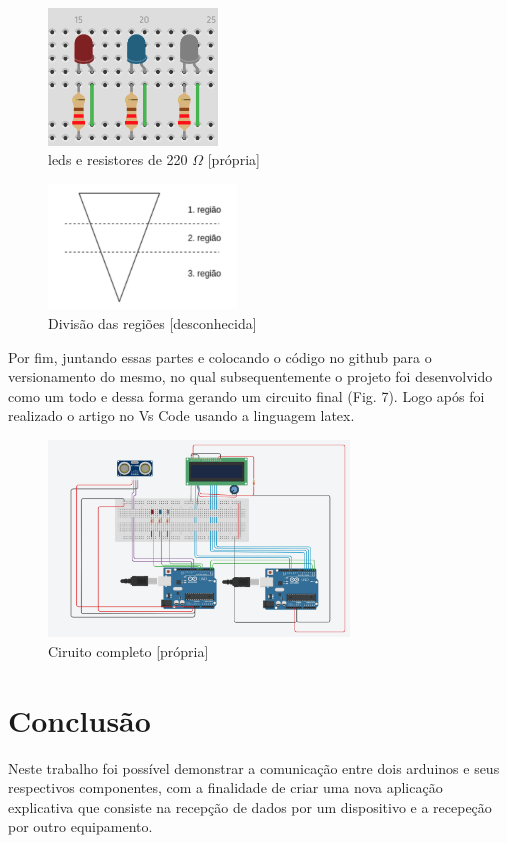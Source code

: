 \documentclass[conference]{IEEEtran}
\begin{document}
 \begin{figure}[htbp]
    \centerline{
        \includegraphics[width=4.5cm]{images/fig5.PNG}
        }
    \caption{leds e resistores de 220 $\Omega$ [própria]}
    \label{figura:fig5}
    \end{figure}

    \begin{figure}[htbp]
        \centerline{
            \includegraphics[width=5cm]{images/fig6.PNG}
            }
        \caption{Divisão das regiões [desconhecida]}
        \label{figura:fig6}
        \end{figure}
Por fim, juntando essas partes e colocando o código no github para o versionamento do mesmo, no qual subsequentemente o projeto foi desenvolvido como um todo e dessa forma gerando um circuito final (Fig. 7). Logo após
foi realizado o artigo no Vs Code usando a linguagem latex.

\begin{figure}[htbp]
    \centerline{
        \includegraphics[width=8cm]{images/fig7.PNG}
        }
    \caption{Ciruito completo [própria]}
    \label{figura:fig6}
    \end{figure}


\section*{Conclusão}
Neste trabalho foi possível demonstrar a comunicação entre dois arduinos e seus respectivos componentes, com a finalidade de criar 
uma nova aplicação explicativa que consiste na recepção de dados por um dispositivo e a recepeção por outro equipamento. 
\end{document}
